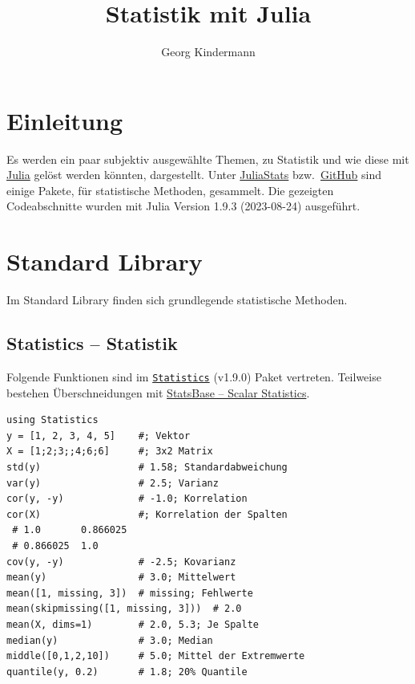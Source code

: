 \documentclass[10pt,twocolumn]{scrartcl}
\title{Statistik mit Julia}
\author{Georg Kindermann}
\begin{document}
\maketitle


\tableofcontents

\section{Einleitung}
\label{sec:einleitung}

Es werden ein paar subjektiv ausgewählte Themen, zu Statistik und wie diese mit
\href{https://julialang.org/}{Julia} gelöst werden könnten, dargestellt. Unter
\href{https://juliastats.org/}{JuliaStats} bzw.\
\href{https://github.com/JuliaStats/}{GitHub} sind einige Pakete, für
statistische Methoden, gesammelt. Die gezeigten Codeabschnitte wurden mit Julia
Version 1.9.3 (2023-08-24) ausgeführt.

\section{Standard Library}
\label{sec:standardLibrary}

Im Standard Library finden sich grundlegende statistische Methoden.

\subsection{Statistics -- Statistik}
\label{ssec:standardLibrary_Statistics}

Folgende Funktionen sind im
\href{https://docs.julialang.org/en/v1/stdlib/Statistics/}{\lstinline|Statistics|}
(v1.9.0) Paket vertreten. Teilweise bestehen Überschneidungen mit
\hyperref[ssec:StatsBase_ScalarStatistics]{StatsBase -- Scalar Statistics}.

\begin{lstlisting}
using Statistics
y = [1, 2, 3, 4, 5]    #; Vektor
X = [1;2;3;;4;6;6]     #; 3x2 Matrix
std(y)                 # 1.58; Standardabweichung
var(y)                 # 2.5; Varianz
cor(y, -y)             # -1.0; Korrelation
cor(X)                 #; Korrelation der Spalten
 # 1.0       0.866025
 # 0.866025  1.0
cov(y, -y)             # -2.5; Kovarianz
mean(y)                # 3.0; Mittelwert
mean([1, missing, 3])  # missing; Fehlwerte
mean(skipmissing([1, missing, 3]))  # 2.0
mean(X, dims=1)        # 2.0, 5.3; Je Spalte
median(y)              # 3.0; Median
middle([0,1,2,10])     # 5.0; Mittel der Extremwerte
quantile(y, 0.2)       # 1.8; 20% Quantile
\end{lstlisting}
\end{document}
